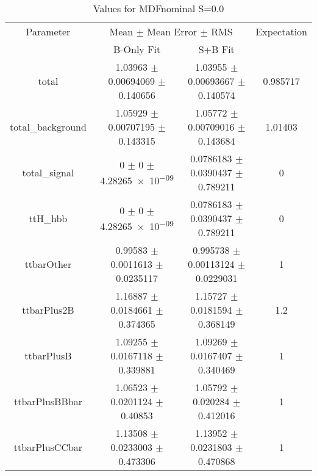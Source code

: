 \begin{table}
\centering
\caption{Values for MDFnominal S=0.0}
\begin{tabular}{cccc}
\toprule
Parameter & \multicolumn{2}{c}{Mean $\pm$ Mean Error $\pm$ RMS} & Expectation\\
 & B-Only Fit & S+B Fit & \\
\midrule
total & \num{1.03963} $\pm$ \num{0.00694069} $\pm$ \num{0.140656} & \num{1.03955} $\pm$ \num{0.00693667} $\pm$ \num{0.140574} & \num{0.985717}\\
total\_background & \num{1.05929} $\pm$ \num{0.00707195} $\pm$ \num{0.143315} & \num{1.05772} $\pm$ \num{0.00709016} $\pm$ \num{0.143684} & \num{1.01403}\\
total\_signal & \num{0} $\pm$ \num{0} $\pm$ \num{4.28265e-09} & \num{0.0786183} $\pm$ \num{0.0390437} $\pm$ \num{0.789211} & \num{0}\\
ttH\_hbb & \num{0} $\pm$ \num{0} $\pm$ \num{4.28265e-09} & \num{0.0786183} $\pm$ \num{0.0390437} $\pm$ \num{0.789211} & \num{0}\\
ttbarOther & \num{0.99583} $\pm$ \num{0.0011613} $\pm$ \num{0.0235117} & \num{0.995738} $\pm$ \num{0.00113124} $\pm$ \num{0.0229031} & \num{1}\\
ttbarPlus2B & \num{1.16887} $\pm$ \num{0.0184661} $\pm$ \num{0.374365} & \num{1.15727} $\pm$ \num{0.0181594} $\pm$ \num{0.368149} & \num{1.2}\\
ttbarPlusB & \num{1.09255} $\pm$ \num{0.0167118} $\pm$ \num{0.339881} & \num{1.09269} $\pm$ \num{0.0167407} $\pm$ \num{0.340469} & \num{1}\\
ttbarPlusBBbar & \num{1.06523} $\pm$ \num{0.0201124} $\pm$ \num{0.40853} & \num{1.05792} $\pm$ \num{0.020284} $\pm$ \num{0.412016} & \num{1}\\
ttbarPlusCCbar & \num{1.13508} $\pm$ \num{0.0233003} $\pm$ \num{0.473306} & \num{1.13952} $\pm$ \num{0.0231803} $\pm$ \num{0.470868} & \num{1}\\
\bottomrule
\end{tabular}
\end{table}